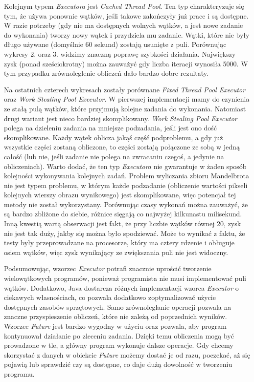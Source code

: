 \documentclass[12pt]{article}
\begin{document}
\medskip
Kolejnym typem \emph{Executora} jest \emph{Cached Thread Pool}. Ten typ charakteryzuje się tym, że używa ponownie wątków, jeśli takowe zakończyły już prace i są dostępne. W razie potrzeby (gdy nie ma dostępnych wolnych wątków, a jest nowe zadanie do wykonania) tworzy nowy wątek i przydziela mu zadanie. Wątki, które nie były długo używane (domyślnie 60 sekund) zostają usunięte z puli.
Porównując wykresy 2. oraz 3. widzimy znaczną poprawę szybkości działania. Największy zysk (ponad sześciokrotny) można zauważyć gdy liczba iteracji wynosiła 5000. W tym przypadku zrównoleglenie obliczeń dało bardzo dobre rezultaty.

\medskip
Na ostatnich czterech wykresach zostały porównane \emph{Fixed Thread Pool Executor} oraz \emph{Work Stealing Pool Executor}. W pierwszej implementacji mamy do czynienia ze stałą pulą wątków, które przyjmują kolejne zadania do wykonania. Natomiast drugi wariant jest nieco bardziej skomplikowany. \emph{Work Stealing Pool Executor} polega na dzieleniu zadania na mniejsze podzadania, jeśli jest ono dość skomplikowane. Każdy wątek oblicza jakąś część podproblemu, a gdy już wszystkie części zostaną obliczone, to części zostają połączone ze sobą w jedną całość (lub nie, jeśli zadanie nie polega na zwracaniu czegoś, a jedynie na obliczeniach). Warto dodać, że ten typ \emph{Executora} nie gwarantuje w żaden sposób kolejności wykonywania kolejnych zadań. Problem wyliczania zbioru Mandelbrota nie jest typem problemu, w którym każde podzadanie (obliczenie wartości pikseli kolejnych wierszy obrazu wynikowego) jest skomplikowane, więc potencjał tej metody nie został wykorzystany. Porównując czasy wykonań można zauważyć, że są bardzo zbliżone do siebie, różnice sięgają co najwyżej kilkunastu milisekund.
Inną kwestią wartą obserwacji jest fakt, że przy liczbie wątków równej 20, zysk nie jest tak duży, jakby się można było spodziewać. Może to wynikać z faktu, że testy były przeprowadzane na procesorze, który ma cztery rdzenie i obługuje osiem wątków, więc zysk wynikający ze zwiększania puli nie jest widoczny.

\medskip
Podsumowując, wzorzec \emph{Executor} potrafi znacznie uprościć tworzenie wielowątkowych programów, ponieważ programista nie musi implementować puli wątków. Dodatkowo, Java dostarcza różnych implementacji wzorca \emph{Executor} o ciekawych własnościach, co pozwala dodatkowo zoptymalizować użycie dostępnych zasobów sprzętowych. Samo zrównoleglanie operacji pozwala na znaczne przyspieszenie obliczeń, które nie zależą od poprzednich wyników. Wzorzec \emph{Future} jest bardzo wygodny w użyciu oraz pozwala, aby program kontynuował działanie po zleceniu zadania. Dzięki temu obliczenia mogą być prowadzone w tle, a główny program wykonuje dalsze operacje. Gdy chcemy skorzystać z danych w obiekcie \emph{Future} możemy dostać je od razu, poczekać, aż się pojawią lub sprawdzić czy są dostępne, co daje dużą dowolność w tworzeniu programu.
\end{document}
